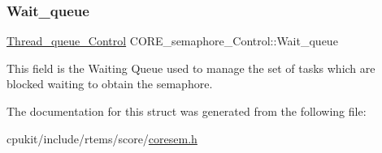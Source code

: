 \subsubsection{\texorpdfstring{Wait\_queue}{Wait\_queue}}
{\footnotesize\ttfamily \mbox{\hyperlink{structThread__queue__Control}{Thread\+\_\+queue\+\_\+\+Control}} C\+O\+R\+E\+\_\+semaphore\+\_\+\+Control\+::\+Wait\+\_\+queue}

This field is the Waiting Queue used to manage the set of tasks which are blocked waiting to obtain the semaphore. 

The documentation for this struct was generated from the following file\+:\begin{DoxyCompactItemize}
\item 
cpukit/include/rtems/score/\mbox{\hyperlink{coresem_8h}{coresem.\+h}}\end{DoxyCompactItemize}
